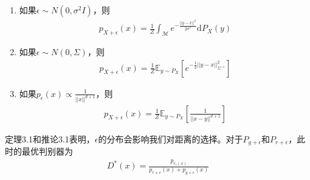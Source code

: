             \begin{corollary}[corollary 3.1]
            \begin{enumerate}
            \item 如果$\epsilon \sim N(0,\sigma^2I)$，则
            \begin{align*}
            p_{X+\epsilon}(x) = \frac{1}{Z}\int_\mathcal{M}e^{-\frac{||y-x||^2}{2\sigma^2}}\mathrm{d}P_X(y)
            \end{align*}
            \item 如果$\epsilon\sim N(0,\Sigma)$，则
            \begin{align*}
            p_{X+\epsilon}(x) = \frac{1}{Z}\mathbb{E}_{y\sim P_X}\left[e^{-\frac{1}{2}||y-x||_{\Sigma^{-1}}^2}\right]
            \end{align*}
            \item 如果$p_\epsilon(x)\propto \frac{1}{||x||^{d+1}}$，则
            \begin{align*}
            p_{X+\epsilon}(x) = \frac{1}{Z}\mathbb{E}_{y\sim P_X}\left[\frac{1}{||x-y||^{d+1}}\right]
            \end{align*}
            \end{enumerate}
            \end{corollary}
            \par
            定理3.1和推论3.1表明，$\epsilon$的分布会影响我们对距离的选择。对于$P_{g+\epsilon}$和$P_{r+\epsilon}$，此时的最优判别器为
            \begin{align*}
            D^*(x) = \frac{p_{r_\epsilon(x)}}{p_{r+\epsilon}(x)+p_{g+\epsilon}(x)}
            \end{align*}

